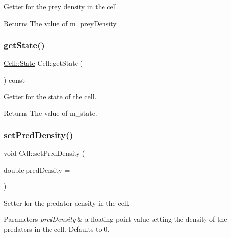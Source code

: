 Getter for the prey density in the cell. 

\begin{DoxyReturn}{Returns}
The value of m\+\_\+prey\+Density. 
\end{DoxyReturn}
\mbox{\label{class_cell_ab8c8914c6eb76fa53c4e77e692792435}} 
\subsubsection{\texorpdfstring{get\+State()}{getState()}}
{\footnotesize\ttfamily \hyperlink{class_cell_a21d74a2efcb79c93e5649b06a50b7cf5}{Cell\+::\+State} Cell\+::get\+State (\begin{DoxyParamCaption}{ }\end{DoxyParamCaption}) const}



Getter for the state of the cell. 

\begin{DoxyReturn}{Returns}
The value of m\+\_\+state. 
\end{DoxyReturn}
\mbox{\label{class_cell_adfd2fa8a4b91e18ca6195f34dbf00546}} 
\subsubsection{\texorpdfstring{set\+Pred\+Density()}{setPredDensity()}}
{\footnotesize\ttfamily void Cell\+::set\+Pred\+Density (\begin{DoxyParamCaption}\item[{double}]{pred\+Density = {} }\end{DoxyParamCaption})}



Setter for the predator density in the cell. 


\begin{DoxyParams}{Parameters}
{\em pred\+Density} & a floating point value setting the density of the predators in the cell. Defaults to 0. \\
\hline
\end{DoxyParams}
\mbox{\label{class_cell_afd3a85027b67dfd4295e2e50253c1058}} 
